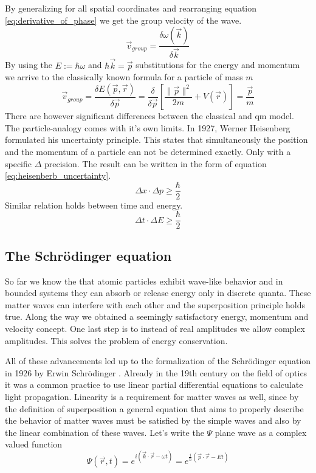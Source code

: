 By generalizing for all spatial coordinates and rearranging equation \ref{eq:derivative_of_phase} we get the group velocity of the wave.
\begin{equation}
	\label{eq:group_velocity}
	\vec{v}_{group} = \frac{\delta \omega(\vec{k})}{\delta \vec{k}}
\end{equation}
By using the $E := \hbar \omega$ and $\hbar \vec{k} = \vec{p}$ substitutions for the energy and momentum we arrive to the classically known formula for a particle of mass $m$
\begin{equation}
	\label{eq:classical_group_velocity}
	\vec{v}_{group} = \frac{\delta E(\vec{p}, \vec{r})}{\delta\vec{p}} = \frac{\delta}{\delta\vec{p}}\left[ \frac{\|\vec{p}\|^2}{2m} + V(\vec{r}) \right] = \frac{\vec{p}}{m}
\end{equation}
There are however significant differences between the classical and \acrshort{qm} model.
The particle-analogy comes with it's own limits.
In 1927, Werner Heisenberg formulated his uncertainty principle.
This states that simultaneously the position and the momentum of a particle can not be determined exactly.
Only with a specific $\Delta$ precision.
The result can be written in the form of equation \ref{eq:heisenberb_uncertainty}.
\begin{equation}
	\label{eq:heisenberb_uncertainty}
	\Delta x \cdot \Delta p \geq \frac{\hbar}{2}
\end{equation}
Similar relation holds between time and energy.
\begin{equation}
	\label{}
	\Delta t \cdot \Delta E \geq \frac{\hbar}{2}
\end{equation}

\subsection{The Schrödinger equation}

So far we know the that atomic particles exhibit wave-like behavior and in bounded systems they can absorb or release energy only in discrete quanta.
These matter waves can interfere with each other and the superposition principle holds true.
Along the way we obtained a seemingly satisfactory energy, momentum and velocity concept.
One last step is to instead of real amplitudes we allow complex amplitudes.
This solves the problem of energy conservation.

All of these advancements led up to the formalization of the Schrödinger equation in 1926 by Erwin Schrödinger \cite{schrodinger1926}.
Already in the 19th century on the field of optics it was a common practice to use linear partial differential equations to calculate light propagation.
Linearity is a requirement for matter waves as well, since by the definition of superposition a general equation that aims to properly describe the behavior of matter waves must be satisfied by the simple waves and also by the linear combination of these waves.
Let's write the $\Psi$ plane wave as a complex valued function
\begin{equation}
	\Psi(\vec{r}, t) = e^{i(\vec{k}\cdot\vec{r} - \omega t)} = e^{\frac{i}{\hbar}(\vec{p}\cdot\vec{r} - Et)}
\end{equation}

